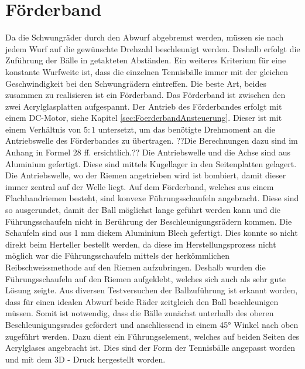 \section{Förderband}
\label{sec:Foerderband}
	Da die Schwungräder durch den Abwurf abgebremst werden, müssen sie nach jedem 
	Wurf auf die gewünschte Drehzahl beschleunigt werden. Deshalb erfolgt die 
	Zuführung der Bälle in getakteten Abständen. Ein weiteres Kriterium für eine 
	konstante Wurfweite ist, dass die einzelnen Tennisbälle immer mit der gleichen Geschwindigkeit bei den Schwungrädern eintreffen. Die beste Art, beides 
	zusammen zu realisieren ist ein Förderband. Das Förderband ist zwischen den zwei 
	Acrylglasplatten aufgespannt. Der Antrieb des Förderbandes erfolgt mit 
	einem DC-Motor, siehe Kapitel \ref{sec:FoerderbandAnsteuerung}. Dieser 
	ist mit einem Verhältnis von  $5:1$ untersetzt, um das benötigte Drehmoment 
	an die Antriebswelle des Förderbandes zu übertragen. ??Die Berechnungen dazu 
	sind im Anhang in Formel 28 ff. ersichtlich.?? Die Antriebswelle und die Achse 
	sind aus Aluminium gefertigt. Diese sind mittels Kugellager in den Seitenplatten gelagert. Die Antriebswelle, wo der Riemen angetrieben wird ist bombiert, 
	damit dieser immer zentral auf der Welle liegt. Auf dem Förderband, welches 
	aus einem Flachbandriemen besteht, sind konvexe Führungsschaufeln angebracht. 
	Diese sind so ausgerundet, damit der Ball möglichst lange geführt werden kann 
	und die Führungsschaufeln nicht in Berührung der Beschleunigungsrädern kommen. 
	Die Schaufeln sind aus 1 mm dickem Aluminium Blech gefertigt. Dies konnte so 
	nicht direkt beim Herteller bestellt werden, da diese im Herstellungsprozess 
	nicht möglich war die Führungsschaufeln mittels der herkömmlichen 
	Reibschweissmethode auf den Riemen aufzubringen. Deshalb wurden die 
	Führungsschaufeln auf den Riemen aufgeklebt, welches sich auch als sehr gute 
	Lösung zeigte. Aus diversen Testversuchen der Ballzuführung ist erkannt worden, 
	dass für einen idealen Abwurf beide Räder zeitgleich den Ball beschleunigen 
	müssen. Somit ist notwendig, dass die Bälle zunächst unterhalb des oberen Beschleunigungsrades gefördert und anschliessend in einem 45° Winkel nach oben 
	zugeführt werden. Dazu dient ein Führungselement, welches auf beiden Seiten des 
	Acrylglases angebracht ist. Dies sind der Form der Tennisbälle angepasst worden 
	und mit dem 3D - Druck hergestellt worden.


